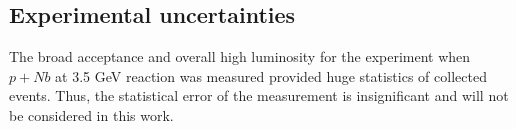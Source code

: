 



\subsection{\label{Uncertainties} Experimental uncertainties} 
 
The broad acceptance and overall high luminosity for the experiment when $p + Nb$ at 3.5 GeV reaction was measured 
provided huge statistics of collected events. 
Thus, the statistical error of the measurement is insignificant and will not be considered in this work. 
 
